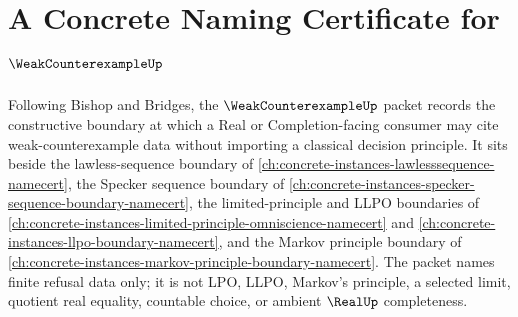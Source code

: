 \chapter{A Concrete Naming Certificate for $\WeakCounterexampleUp$}
\label{ch:concrete-instances-weak-counterexample-namecert}

Following Bishop and Bridges, the $\WeakCounterexampleUp$ packet records the constructive boundary at which a Real or Completion-facing consumer may cite weak-counterexample data without importing a classical decision principle. It sits beside the lawless-sequence boundary of \autoref{ch:concrete-instances-lawlesssequence-namecert}, the Specker sequence boundary of \autoref{ch:concrete-instances-specker-sequence-boundary-namecert}, the limited-principle and LLPO boundaries of \autoref{ch:concrete-instances-limited-principle-omniscience-namecert} and \autoref{ch:concrete-instances-llpo-boundary-namecert}, and the Markov principle boundary of \autoref{ch:concrete-instances-markov-principle-boundary-namecert}. The packet names finite refusal data only; it is not LPO, LLPO, Markov's principle, a selected limit, quotient real equality, countable choice, or ambient $\RealUp$ completeness.

